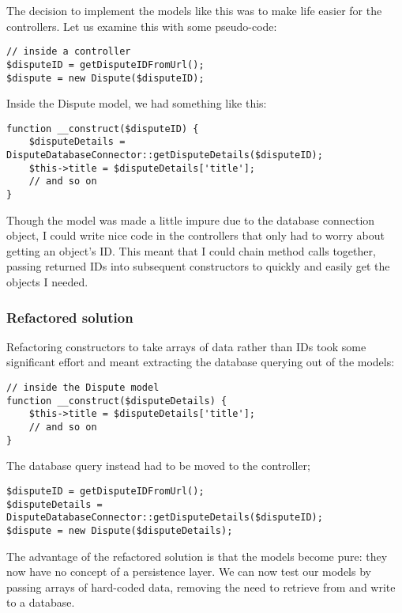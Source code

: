 The decision to implement the models like this was to make life easier for the controllers. Let us examine this with some pseudo-code:

\begin{lstlisting}
// inside a controller
$disputeID = getDisputeIDFromUrl();
$dispute = new Dispute($disputeID);
\end{lstlisting}

Inside the Dispute model, we had something like this:

\begin{minipage}{\textwidth}
\begin{lstlisting}
function __construct($disputeID) {
    $disputeDetails = DisputeDatabaseConnector::getDisputeDetails($disputeID);
    $this->title = $disputeDetails['title'];
    // and so on
}
\end{lstlisting}
\end{minipage}

Though the model was made a little impure due to the database connection object, I could write nice code in the controllers that only had to worry about getting an object's ID. This meant that I could chain method calls together, passing returned IDs into subsequent constructors to quickly and easily get the objects I needed.

\subsubsection{Refactored solution}

Refactoring constructors to take arrays of data rather than IDs took some significant effort and meant extracting the database querying out of the models:

\begin{lstlisting}
// inside the Dispute model
function __construct($disputeDetails) {
    $this->title = $disputeDetails['title'];
    // and so on
}
\end{lstlisting}

The database query instead had to be moved to the controller;

\begin{lstlisting}
$disputeID = getDisputeIDFromUrl();
$disputeDetails = DisputeDatabaseConnector::getDisputeDetails($disputeID);
$dispute = new Dispute($disputeDetails);
\end{lstlisting}

The advantage of the refactored solution is that the models become pure: they now have no concept of a persistence layer. We can now test our models by passing arrays of hard-coded data, removing the need to retrieve from and write to a database.

